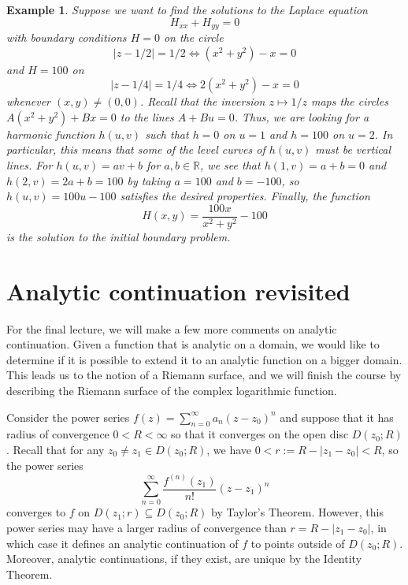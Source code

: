 \documentclass[10pt]{article}
\newcommand{\R}{\mathbb{R}}
\theoremstyle{newstyle}
\newtheorem{exmp}[thm]{Example}
\begin{document}
\begin{exmp}
Suppose we want to find the solutions to the Laplace equation 
\[ H_{xx} + H_{yy} = 0 \]
with boundary conditions $H = 0$ on the circle 
\[ |z - 1/2| = 1/2 \iff (x^2 + y^2) - x = 0 \]
and $H = 100$ on 
\[ |z - 1/4| = 1/4 \iff 2(x^2 + y^2) - x = 0 \]
whenever $(x, y) \neq (0, 0)$. Recall that the inversion $z \mapsto 1/z$ maps the circles 
$A(x^2 + y^2) + Bx = 0$ to the lines $A + Bu = 0$. Thus, we are looking for a harmonic 
function $h(u, v)$ such that $h = 0$ on $u = 1$ and $h = 100$ on $u = 2$. In particular, 
this means that some of the level curves of $h(u, v)$ must be vertical lines. For
$h(u, v) = av + b$ for $a, b \in \R$, we see that $h(1, v) = a + b = 0$ and 
$h(2, v) = 2a + b = 100$ by taking $a = 100$ and $b = -100$, so $h(u, v) = 100u - 100$ satisfies 
the desired properties. Finally, the function 
\[ H(x, y) = \frac{100x}{x^2 + y^2} - 100 \] 
is the solution to the initial boundary problem. 
\end{exmp}

\newpage
\section{Analytic continuation revisited}

For the final lecture, we will make a few more comments on analytic continuation. Given 
a function that is analytic on a domain, we would like to determine if it is possible 
to extend it to an analytic function on a bigger domain. This leads us to the notion of a 
Riemann surface, and we will finish the course by describing the Riemann surface of the 
complex logarithmic function. 

Consider the power series $f(z) = \sum_{n=0}^\infty a_n(z-z_0)^n$ and suppose that it has 
radius of convergence $0 < R < \infty$ so that it converges on the open disc $D(z_0; R)$. 
Recall that for any $z_0 \neq z_1 \in D(z_0; R)$, we have $0 < r := R - |z_1 - z_0| < R$, so the 
power series 
\[ \sum_{n=0}^\infty \frac{f^{(n)}(z_1)}{n!}(z-z_1)^n \]
converges to $f$ on $D(z_1; r) \subseteq D(z_0; R)$ by Taylor's Theorem. However, 
this power series may have a larger radius of convergence than $r = R - |z_1 - z_0|$, 
in which case it defines an analytic continuation of $f$ to points outside of $D(z_0; R)$. 
Moreover, analytic continuations, if they exist, are unique by the Identity Theorem. 
\end{document}
